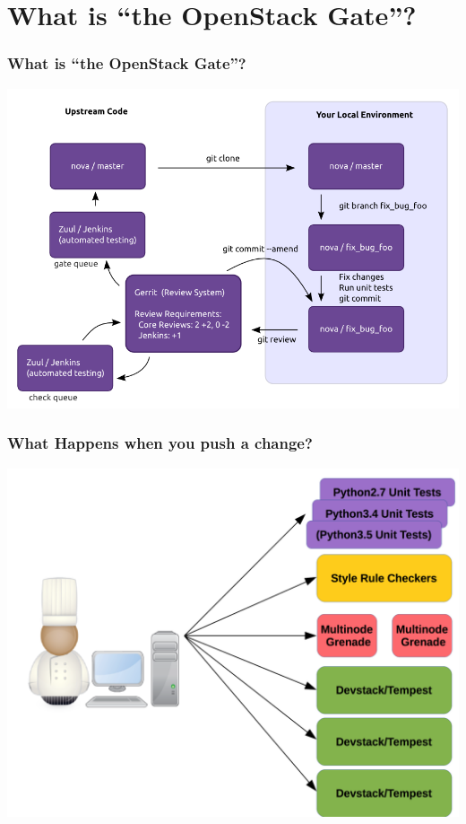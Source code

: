 \documentclass[aspectratio=43,11pt,hyperref={colorlinks=true}]{beamer}
\begin{document}
\section{What is ``the OpenStack Gate''?}
\begin{frame}
    \frametitle{What is ``the OpenStack Gate''?}
	\begin{center}
		\includegraphics[width=.65\textwidth]{code_review.png}
	\end{center}
\end{frame}

\begin{frame}
\frametitle{What Happens when you push a change?}
\begin{center}
	\includegraphics[width=.7\textwidth]{jobs.png}
\end{center}
\end{frame}
\end{document}

